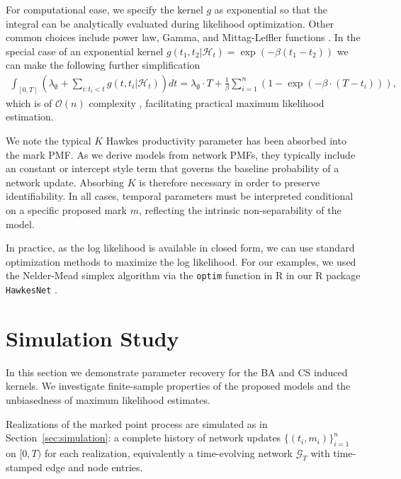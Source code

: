 \documentclass[12pt]{article}
\begin{document}
For computational ease, we specify the kernel $g$ as exponential so that the integral can be analytically evaluated during likelihood optimization. Other common choices include power law, Gamma, and Mittag-Leffler functions \citep{hawkes2018hawkes}. In the special case of an exponential kernel $g(t_1,t_2\vert \mathcal{H}_t) = \exp(-\beta(t_1-t_2))$ we can make the following further simplification
\begin{align}\label{eqn:simpleLL}
\int_{[0,T]} \left( \lambda_{\emptyset} + \sum_{i : t_{i} < t} g(t,t_i\vert \mathcal{H}_t) \right) dt = \lambda_{\emptyset}\cdot T  +    \frac{1}{\beta} \sum_{i=1}^{n}  \left(1- \exp(-\beta\cdot(T-t_{i}))\right),
\end{align}
which is of $\mathcal{O}(n)$ complexity \cite{cui2020elementary}, facilitating practical maximum likelihood estimation.

We note the typical $K$ Hawkes productivity parameter has been absorbed into the mark PMF. As we derive models from network PMFs, they typically include an constant or intercept style term that governs the baseline probability of a network update. Absorbing $K$ is therefore necessary in order to preserve identifiability. In all cases, temporal parameters must be interpreted conditional on a specific proposed mark $m$, reflecting the intrinsic non-separability of the model.

In practice, as the log likelihood is available in closed form, we can use standard optimization methods to maximize the log likelihood. For our examples, we used the Nelder-Mead simplex algorithm \citep{NelderMead1965} via the \texttt{optim} function in R \citep{RCoreTeam2025} in our R package \texttt{HawkesNet} \citep{hawkesNest}.



\section{Simulation Study}\label{sec:simulation_study}

In this section we demonstrate parameter recovery for the BA and CS induced kernels. We investigate finite-sample properties of the proposed models and the unbiasedness of maximum likelihood estimates.

Realizations of the marked point process are simulated as in Section~\ref{sec:simulation}: a complete history of network updates $\{(t_i, m_i)\}_{i=1}^n$ on $[0, T)$ for each realization, equivalently a time-evolving network $\mathcal{G}_T$ with time-stamped edge and node entries.
\end{document}
